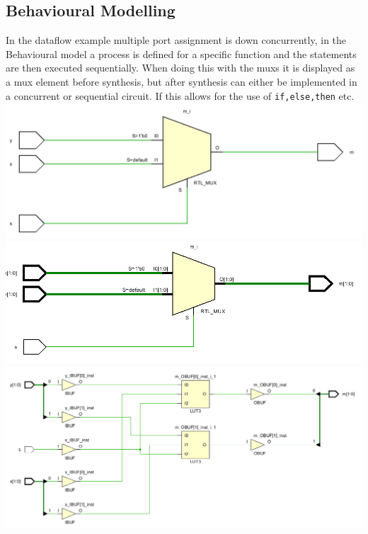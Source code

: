 \documentclass[11pt]{article}
\begin{document}
\begin{preview}
        \subsection{Behavioural Modelling}
        In the dataflow example multiple port assignment is down concurrently, in the Behavioural model a process is defined for a specific function and the statements are then executed sequentially. When doing this with the muxs it is displayed as a mux element before synthesis, but after synthesis can either be implemented in a concurrent or sequential circuit. If this allows for the use of \texttt{if,else,then} etc.
        \includegraphics[width=\textwidth]{res/part3/part3_1bitmux.PNG}
        \includegraphics[width=\textwidth]{res/part3/part3_2bitmux.PNG}
        \includegraphics[width=\textwidth]{res/part3/part3_2bitmux_synth.PNG}

\end{preview}
\end{document}
